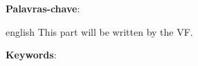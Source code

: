 
\setlength{\absparsep}{18pt} %
\begin{resumo}
\SingleSpacing



 \textbf{Palavras-chave}: \imprimirpalavraschave
\end{resumo}

\begin{resumo}[Abstract]
\begin{otherlanguage*}{english}
\linespread{1.3}
\SingleSpacing
This part will be written by the VF.

\vspace{\onelineskip}
\noindent 
\textbf{Keywords}: \imprimirkeywords
\end{otherlanguage*}
\end{resumo}